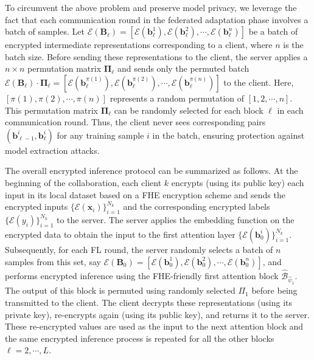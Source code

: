 To circumvent the above problem and preserve model privacy, we leverage the fact that each communication round in the federated adaptation phase involves a batch of samples. Let $\mathcal{E}(\mathbf{B}_{\ell}) = [\mathcal{E}(\mathbf{b}_{\ell}^1),\mathcal{E}(\mathbf{b}_{\ell}^2),\cdots,\mathcal{E}(\mathbf{b}_{\ell}^n)]$ be a batch of encrypted intermediate representations corresponding to a client, where $n$ is the batch size. Before sending these representations to the client, the server applies a $n \times n$ permutation matrix $\mathbf{\Pi}_{\ell}$ and sends only the permuted batch $\mathcal{E}(\mathbf{B}_{\ell})\cdot \mathbf{\Pi}_{\ell} = [\mathcal{E}(\mathbf{b}_{\ell}^{\pi(1)}),\mathcal{E}(\mathbf{b}_{\ell}^{\pi(2)}),\cdots,\mathcal{E}(\mathbf{b}_{\ell}^{\pi(n)})]$ to the client. Here, $[\pi(1),\pi(2),\cdots,\pi(n)]$ represents a random permutation of $[1,2,\cdots,n]$. This permutation matrix $\mathbf{\Pi}_{\ell}$ can be randomly selected for each block $\ell$ in each communication round. Thus, the client never sees corresponding pairs $(\mathbf{b}_{\ell-1}^i,\mathbf{b}_{\ell}^i)$ for any training sample $i$ in the batch, ensuring protection against model extraction attacks.

The overall encrypted inference protocol can be summarized as follows. At the beginning of the collaboration, each client $k$ encrypts (using its public key) each input in its local dataset based on a FHE encryption scheme and sends the encrypted inputs $\{\mathcal{E}(\mathbf{x}_i)\}_{i=1}^{N_k}$ and the corresponding encrypted labels $\{\mathcal{E}(y_i)\}_{i=1}^{N_k}$ to the server. The server applies the embedding function on the encrypted data to obtain the input to the first attention layer $\{\mathcal{E}(\mathbf{b}_0^i)\}_{i=1}^{N_k}$. Subsequently, for each FL round, the server randomly selects a batch of $n$ samples from this set, say $\mathcal{E}(\mathbf{B}_{0}) = [\mathcal{E}(\mathbf{b}_{0}^1),\mathcal{E}(\mathbf{b}_{0}^2),\cdots,\mathcal{E}(\mathbf{b}_{0}^n)]$, and performs encrypted inference using the FHE-friendly first attention block $\widehat{\mathcal{B}}_{\widehat{\psi}_1}$. The output of this block is permuted using randomly selected $\Pi_1$ before being transmitted to the client. The client decrypts these representations (using its private key), re-encrypts again (using its public key), and returns it to the server. These re-encrypted values are used as the input to the next attention block and the same encrypted inference process is repeated for all the other blocks $\ell = 2,\cdots,L$. 

